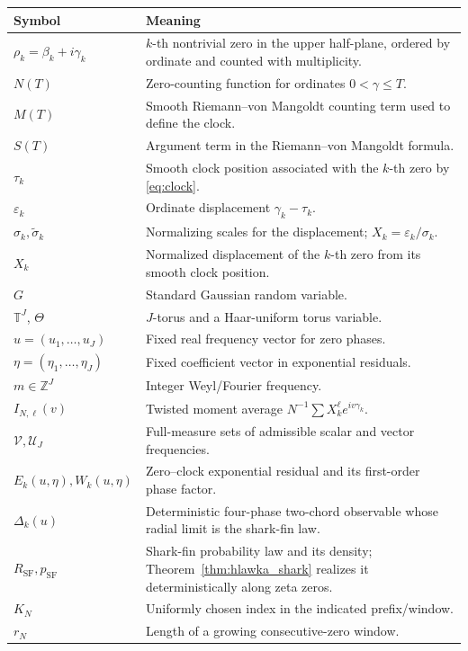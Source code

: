 \documentclass[pdflatex,sn-mathphys-num]{sn-jnl}
\numberwithin{equation}{section}
\theoremstyle{thmstyleone}
\theoremstyle{thmstylethree}
\theoremstyle{thmstyletwo}
\newcommand{\Z}{\mathbb Z}
\newcommand{\Torus}{\mathbb T}
\newcommand{\RSF}{R_{\mathrm{SF}}}
\newcommand{\1}{\mathbf 1}
\begin{document}
\begin{longtable}{@{}p{}p{}@{}}
\toprule
Symbol & Meaning\\
\midrule
\(\rho_k=\beta_k+i\gamma_k\) & \(k\)-th nontrivial zero in the upper half-plane, ordered by ordinate and counted with multiplicity.\\
\(N(T)\) & Zero-counting function for ordinates \(0<\gamma\le T\).\\
\(M(T)\) & Smooth Riemann--von Mangoldt counting term used to define the clock.\\
\(S(T)\) & Argument term in the Riemann--von Mangoldt formula.\\
\(\tau_k\) & Smooth clock position associated with the \(k\)-th zero by \eqref{eq:clock}.\\
\(\varepsilon_k\) & Ordinate displacement \(\gamma_k-\tau_k\).\\
\(\sigma_k,\widetilde\sigma_k\) & Normalizing scales for the displacement; \(X_k=\varepsilon_k/\sigma_k\).\\
\(X_k\) & Normalized displacement of the \(k\)-th zero from its smooth clock position.\\
\(G\) & Standard Gaussian random variable.\\
\(\Torus^J\), \(\Theta\) & \(J\)-torus and a Haar-uniform torus variable.\\
\(u=(u_1,\ldots,u_J)\) & Fixed real frequency vector for zero phases.\\
\(\eta=(\eta_1,\ldots,\eta_J)\) & Fixed coefficient vector in exponential residuals.\\
\(m\in\Z^J\) & Integer Weyl/Fourier frequency.\\
\(I_{N,\ell}(v)\) & Twisted moment average \(N^{-1}\sum X_k^\ell e^{iv\gamma_k}\).\\
\(\mathcal V,\mathcal U_J\) & Full-measure sets of admissible scalar and vector frequencies.\\
\(E_k(u,\eta),W_k(u,\eta)\) & Zero--clock exponential residual and its first-order phase factor.\\
\(\Delta_k(u)\) & Deterministic four-phase two-chord observable whose radial limit is the shark-fin law.\\
\(\RSF,p_{\mathrm{SF}}\) & Shark-fin probability law and its density; Theorem~\ref{thm:hlawka_shark} realizes it deterministically along zeta zeros.\\
\(K_N\) & Uniformly chosen index in the indicated prefix/window.\\
\(r_N\) & Length of a growing consecutive-zero window.\\

\end{longtable}
\end{document}
